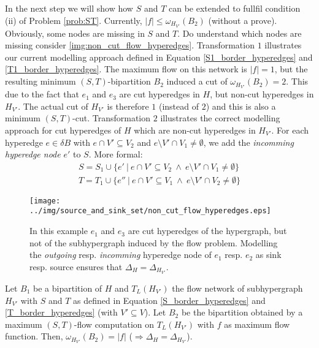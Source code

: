 In the next step we will show how $S$ and $T$ can be extended to fullfil condition (ii)
of Problem \autoref{prob:ST}. Currently, $|f| \le \omega_{H_{V'}}(B_2)$ (without a prove).
Obviously, some nodes are missing in $S$ and $T$. Do understand which nodes are missing consider
\autoref{img:non_cut_flow_hyperedges}. Transformation $1$ illustrates our current modelling
approach defined in Equation \ref{S1_border_hyperedges} and \ref{T1_border_hyperedges}. The maximum
flow on this network is $|f| = 1$, but the resulting minimum $(S,T)$-bipartition $B_2$ induced 
a cut of $\omega_{H_{V'}}(B_2) = 2$. This due to the fact that $e_1$ and $e_3$ are cut
hyperedges in $H$, but non-cut hyperedges in $H_{V'}$. The actual cut of $H_{V'}$ is therefore
$1$ (instead of $2$) and this is also a minimum $(S,T)$-cut. Transformation $2$ illustrates the
correct modelling approach for cut hyperedges of $H$ which are non-cut hyperedges in $H_{V'}$.
For each hyperedge $e \in \delta B$ with $e \cap V' \subseteq V_2$ and $e \setminus V' \cap V_1 \neq \emptyset$, 
we add the \emph{incomming hyperedge node} $e'$ to $S$.
More formal:
\begin{align}
S = S_1 \cup \{e'\ |\ e \cap V' \subseteq V_2 \ \land\ e \setminus V' \cap V_1  \neq \emptyset\} \label{S_border_hyperedges}\\
T = T_1 \cup \{e''\ |\ e \cap V' \subseteq V_1 \ \land\ e \setminus V' \cap V_2 \neq \emptyset \} \label{T_border_hyperedges}
\end{align}

\begin{figure}
\centering
\texttt{[image: ../img/source\_and\_sink\_set/non\_cut\_flow\_hyperedges.eps]}
\caption{In this example $e_1$ and $e_3$ are cut hyperedges of the hypergraph, but not of
        the subhypergraph induced by the flow problem. Modelling the \emph{outgoing} resp.
        \emph{incomming} hyperedge node of $e_1$ resp. $e_2$ as sink resp. source ensures
        that $\Delta_H = \Delta_{H_{V'}}$.} 
\label{img:non_cut_flow_hyperedges}
\end{figure}

\begin{lemma}
\label{lemma:delta_proof}
Let $B_1$ be a bipartition of $H$ and $T_L(H_{V'})$ the flow network of subhypergraph
$H_{V'}$ with $S$ and $T$ as defined in Equation \ref{S_border_hyperedges} and \ref{T_border_hyperedges} (with $V' \subseteq V$).
Let $B_2$ be the bipartition obtained by a maximum $(S,T)$-flow computation on $T_L(H_{V'})$
with $f$ as maximum flow function.
Then, $\omega_{H_{V'}}(B_2) = |f|$ ($\Rightarrow \Delta_H = \Delta_{H_{V'}}$).
\end{lemma}
 
